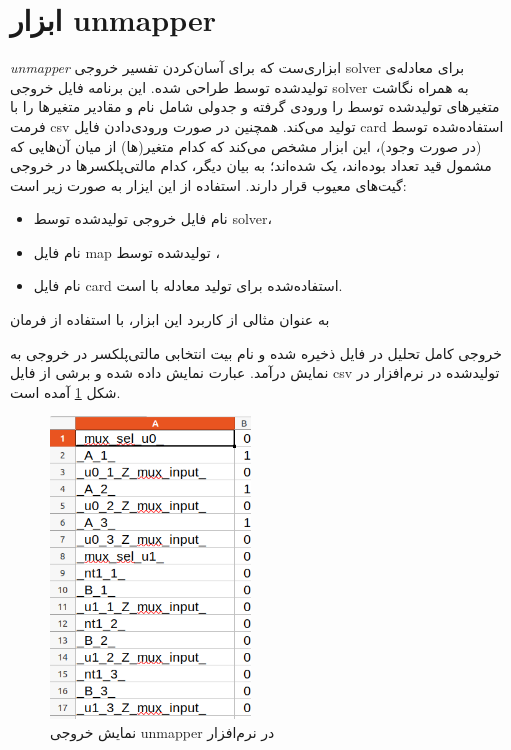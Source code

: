 \documentclass{article}
\begin{document}
\section{ابزار unmapper}

\textit{unmapper}
ابزاری‌ست که برای آسان‌کردن تفسیر خروجی solver برای معادله‌ی تولیدشده توسط  طراحی شده. این برنامه فایل خروجی solver به همراه نگاشت متغیرهای تولیدشده توسط  را ورودی گرفته و جدولی شامل نام و مقادیر متغیرها را با فرمت csv تولید می‌کند. همچنین در صورت ورودی‌دادن فایل card استفاده‌شده توسط  (در صورت وجود)، این ابزار مشخص می‌کند که کدام متغیر(ها) از میان آن‌هایی که مشمول قید تعداد بوده‌اند، یک شده‌اند؛ به بیان دیگر، کدام مالتی‌پلکسرها در خروجی گیت‌های معیوب قرار دارند. استفاده از این ایزار به صورت زیر است: 

\begin{flushleft}
\end{flushleft}

\begin{itemize}

\item {} 
نام فایل خروجی تولیدشده توسط solver، 
\item {}
نام فایل map تولیدشده توسط ، 
\item {}
نام فایل card استفاده‌شده برای تولید معادله با  است.
\end{itemize}

به عنوان مثالی از کاربرد این ابزار، با استفاده از فرمان 
\begin{flushleft}
\end{flushleft}

خروجی کامل تحلیل در فایل  ذخیره شده و نام بیت انتخابی مالتی‌پلکسر در خروجی به نمایش درآمد. عبارت  نمایش داده شده و برشی از فایل csv تولیدشده در نرم‌افزار  در شکل \ref{fig:csv} آمده است. 

\begin{figure}[h]
\centering
\includegraphics[height=8cm]{figures/csv1.png}
\caption{نمایش خروجی unmapper در نرم‌افزار }
\label{fig:csv}
\end{figure}
\end{document}
